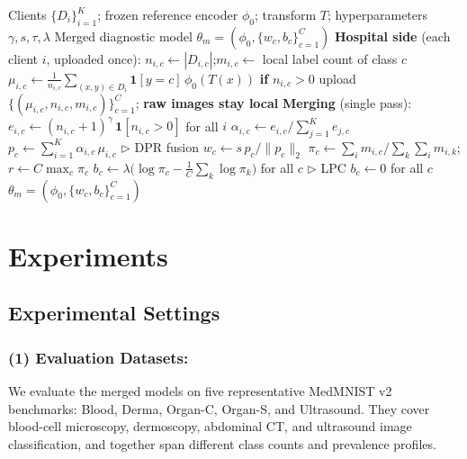 \documentclass[letterpaper]{article} %
\begin{document}
\begin{algorithm}[!t]
\caption{LAMP-Merge}
\label{alg:lamp}
\begin{algorithmic}[1]
\REQUIRE Clients $\{D_i\}_{i=1}^{K}$; frozen reference encoder $\phi_0$; transform $T$; hyperparameters $\gamma,s,\tau,\lambda$
\ENSURE Merged diagnostic model $\theta_m=(\phi_0,\{w_c,b_c\}_{c=1}^{C})$
\STATE \textbf{Hospital side} (each client $i$, uploaded once):
    \STATE $n_{i,c}\leftarrow |D_{i,c}|$;\quad $m_{i,c}\leftarrow$ local label count of class $c$
    \STATE $\mu_{i,c}\leftarrow \frac{1}{n_{i,c}}\sum_{(x,y)\in D_i}\mathbf{1}[y=c]\,\phi_0(T(x))$ \quad\textbf{if } $n_{i,c}>0$
\ENDFOR
\STATE upload $\{(\mu_{i,c},n_{i,c},m_{i,c})\}_{c=1}^{C}$; \textbf{raw images stay local}
\STATE \textbf{Merging} (single pass):
    \STATE $e_{i,c}\leftarrow (n_{i,c}+1)^{\gamma}\,\mathbf{1}[n_{i,c}>0]$ for all $i$
    \STATE $\alpha_{i,c}\leftarrow e_{i,c}\big/\sum_{j=1}^{K} e_{j,c}$
    \STATE $p_c\leftarrow \sum_{i=1}^{K}\alpha_{i,c}\,\mu_{i,c}$ \hfill $\triangleright$ DPR fusion
    \STATE $w_c\leftarrow s\,p_c/\|p_c\|_2$
\ENDFOR
\STATE $\pi_c\leftarrow \sum_{i} m_{i,c}\big/\sum_{k}\sum_{i} m_{i,k}$;\quad $r\leftarrow C\max_c \pi_c$
    \STATE $b_c\leftarrow \lambda\big(\log\pi_c-\frac{1}{C}\sum_{k}\log\pi_k\big)$ for all $c$ \hfill $\triangleright$ LPC
\ELSE
    \STATE $b_c\leftarrow 0$ for all $c$
\ENDIF
\RETURN $\theta_m=(\phi_0,\{w_c,b_c\}_{c=1}^{C})$
\end{algorithmic}
\end{algorithm}



\section{Experiments}

\subsection{Experimental Settings}

\subsubsection{(1) Evaluation Datasets:}

We evaluate the merged models on five representative MedMNIST v2 benchmarks\cite{yang2023medmnist}: Blood, Derma, Organ-C, Organ-S, and Ultrasound. They cover blood-cell microscopy, dermoscopy, abdominal CT, and ultrasound image classification, and together span different class counts and prevalence profiles.
\end{document}
